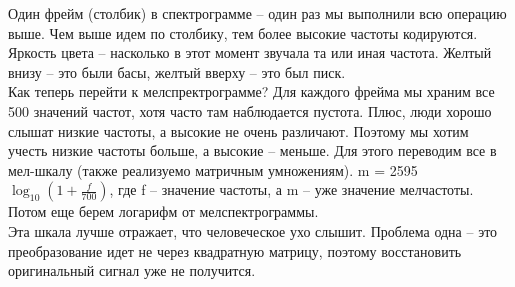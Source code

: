 Один фрейм (столбик) в спектрограмме -- один раз мы выполнили всю операцию выше. Чем выше идем по столбику, тем более высокие частоты кодируются. Яркость цвета -- насколько в этот момент звучала та или иная частота. Желтый внизу -- это были басы, желтый вверху -- это был писк. \\ 

Как теперь перейти к мелспректрограмме? Для каждого фрейма мы храним все 500 значений частот, хотя часто там наблюдается пустота. Плюс, люди хорошо слышат низкие частоты, а высокие не очень различают. Поэтому мы хотим учесть низкие частоты больше, а высокие -- меньше. Для этого переводим все в мел-шкалу (также реализуемо матричным умножениям). m = 2595 $\log_{10}(1 + \frac{f}{700})$, где f -- значение частоты, а m -- уже значение мелчастоты. Потом еще берем логарифм от мелспектрограммы. \\ 

Эта шкала лучше отражает, что человеческое ухо слышит. Проблема одна -- это преобразование идет не через квадратную матрицу, поэтому восстановить оригинальный сигнал уже не получится. 
